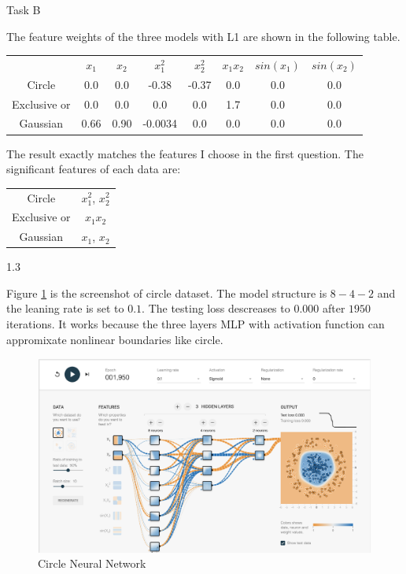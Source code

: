 \documentclass[11pt]{article}
\begin{document}
\begin{enumerate}
Task B
\medskip

The feature weights of the three models with L1 are shown in the following table.

\begin{center}
  \begin{tabular}{ |c|c|c|c|c|c|c|c| }
   \hline
     & $x_1$ & $x_2$ & $x_1^2$ & $x_2^2$ & $x_1x_2$ & $sin(x_1)$ & $sin(x_2)$ \\
    Circle & 0.0 & 0.0 & -0.38 & -0.37 & 0.0 & 0.0 & 0.0 \\
    Exclusive or & 0.0 & 0.0 & 0.0 & 0.0 & 1.7 & 0.0 & 0.0 \\
    Gaussian & 0.66 & 0.90 & -0.0034 & 0.0 & 0.0 & 0.0 & 0.0 \\
    \hline
  \end{tabular}
\end{center}

The result exactly matches the features I choose in the first question. The significant features of each data are:

\begin{center}
  \begin{tabular}{ |c|c| }
   \hline
    Circle & $x_1^2$, $x_2^2$ \\
    Exclusive or & $x_1x_2$ \\
    Gaussian & $x_1$, $x_2$ \\
    \hline
  \end{tabular}
\end{center}

1.3
\medskip

Figure \ref{fig:circle_nn} is the screenshot of circle dataset. The model structure is $8-4-2$ and the leaning rate is set to $0.1$. The testing loss descreases to $0.000$ after $1950$ iterations. It works because the three layers MLP with activation function can appromixate nonlinear boundaries like circle.

\begin{figure}[!h]
  \centering
  \includegraphics[width=\linewidth]{figures/1_3/circle.png}
  \caption{Circle Neural Network}
  \label{fig:circle_nn}
\end{figure}



\end{enumerate}
\end{document}

